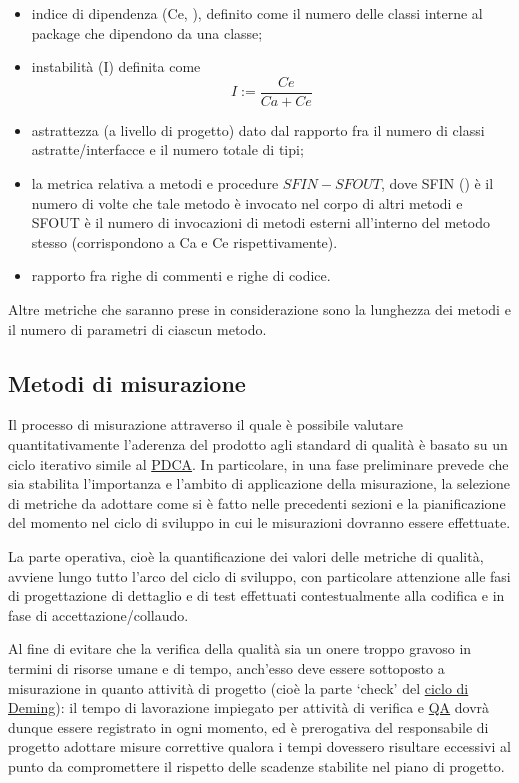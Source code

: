 \begin{itemize}
  \item indice di dipendenza (Ce, ), definito come il numero delle classi interne al package che dipendono da una classe;
  \item instabilità (I) definita come \[
  I := \frac{Ce}{Ca + Ce}
  \]
  \item astrattezza (a livello di progetto) dato dal rapporto fra il numero di classi astratte/interfacce e il numero totale di tipi;
  \item la metrica relativa a metodi e procedure $SFIN - SFOUT$, dove SFIN () è il numero di volte che tale metodo è invocato nel corpo di altri metodi e SFOUT è il numero di invocazioni di metodi esterni all'interno del metodo stesso (corrispondono a Ca e Ce rispettivamente).
  \item rapporto fra righe di commenti e righe di codice.
\end{itemize}

Altre metriche che saranno prese in considerazione sono la lunghezza dei metodi e il numero di parametri di ciascun metodo.

\subsection{Metodi di misurazione}
Il processo di misurazione attraverso il quale è possibile valutare quantitativamente l'aderenza del prodotto agli standard di qualità è basato su un ciclo iterativo simile al \underline{PDCA}\@. In particolare, in una fase preliminare prevede che sia stabilita l'importanza e l'ambito di applicazione della misurazione, la selezione di metriche da adottare come si è fatto nelle precedenti sezioni e la pianificazione del momento nel ciclo di sviluppo in cui le misurazioni dovranno essere effettuate.

La parte operativa, cioè la quantificazione dei valori delle metriche di qualità, avviene lungo tutto l'arco del ciclo di sviluppo, con particolare attenzione alle fasi di progettazione di dettaglio e di test effettuati contestualmente alla codifica e in fase di accettazione/collaudo.

Al fine di evitare che la verifica della qualità sia un onere troppo gravoso in termini di risorse umane e di tempo, anch'esso deve essere sottoposto a misurazione in quanto attività di progetto (cioè la parte `check' del \underline{ciclo di Deming}): il tempo di lavorazione impiegato per attività di verifica e \underline{QA} dovrà dunque essere registrato in ogni momento, ed è prerogativa del responsabile di progetto adottare misure correttive qualora i tempi dovessero risultare eccessivi al punto da compromettere il rispetto delle scadenze stabilite nel piano di progetto.

